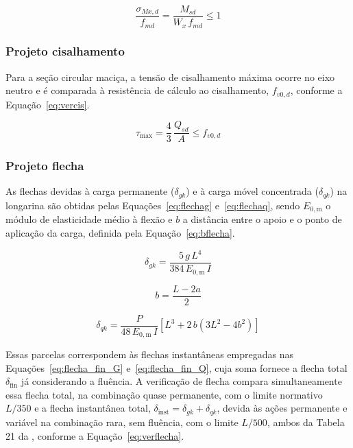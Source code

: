 \begin{equation}
\frac{\sigma_{Mx,d}}{f_{md}} = \frac{M_{sd}}{W_x\,f_{md}} \leq 1
\label{eq:verflexao}
\end{equation}

\subsubsection{Projeto cisalhamento}

Para a seção circular maciça, a tensão de cisalhamento máxima ocorre no eixo neutro e é comparada à resistência de cálculo ao cisalhamento, $f_{v0,d}$, conforme a Equação~\eqref{eq:vercis}.

\begin{equation}
\tau_{\max} = \frac{4}{3}\,\frac{Q_{sd}}{A} \leq f_{v0,d}
\label{eq:vercis}
\end{equation}

\subsubsection{Projeto flecha}

As flechas devidas à carga permanente ($\delta_{gk}$) e à carga móvel concentrada ($\delta_{qk}$) na longarina são obtidas pelas Equações~\eqref{eq:flechag} e~\eqref{eq:flechaq}, sendo $E_{0,\mathrm{m}}$ o módulo de elasticidade médio à flexão e $b$ a distância entre o apoio e o ponto de aplicação da carga, definida pela Equação~\eqref{eq:bflecha}.

\begin{equation}
\delta_{gk} = \frac{5\,g\,L^4}{384\,E_{0,\mathrm{m}}\,I}
\label{eq:flechag}
\end{equation}

\begin{equation}
b = \frac{L - 2a}{2}
\label{eq:bflecha}
\end{equation}

\begin{equation}
\delta_{qk} = \frac{P}{48\,E_{0,\mathrm{m}}\,I}\left[L^3 + 2\,b\left(3L^2 - 4b^2\right)\right]
\label{eq:flechaq}
\end{equation}

Essas parcelas correspondem às flechas instantâneas empregadas nas Equações~\eqref{eq:flecha_fin_G} e~\eqref{eq:flecha_fin_Q}, cuja soma fornece a flecha total $\delta_{\mathrm{fin}}$ já considerando a fluência.
A verificação de flecha compara simultaneamente essa flecha total, na combinação quase permanente, com o limite normativo $L/350$ e a flecha instantânea total, $\delta_{\mathrm{inst}} = \delta_{gk} + \delta_{qk}$, devida às ações permanente e variável na combinação rara, sem fluência, com o limite $L/500$, ambos da Tabela 21 da \textcite{NBR7190-1:2022}, conforme a Equação~\eqref{eq:verflecha}.

